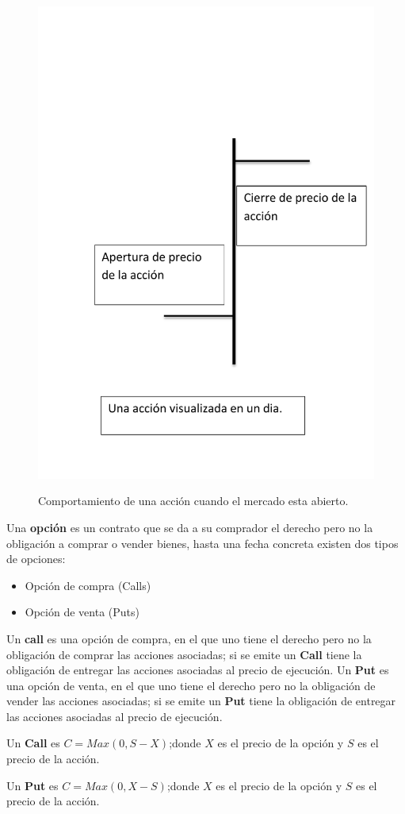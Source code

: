 		  \newline
		 \begin{figure}[h!]
		 	\centering
		 	\label{Apertura y cierre}
		 	\includegraphics[width=0.35\linewidth]{a}\\
		 	\caption[Titulo en el índice de figuras (opcional)]{Comportamiento de una acción cuando el mercado esta abierto.}
		 \end{figure}
		  \newpage
Una \textbf{opción} es un contrato que se da a su comprador el derecho pero no la obligación a comprar o vender bienes, hasta una fecha concreta existen dos tipos de opciones:
	\begin{itemize}
		\item Opción de compra (Calls) 
		\item Opción de venta (Puts) 
	
	\end{itemize}

Un \textbf{call} es una opción de compra, en el que uno tiene el derecho pero no la obligación de comprar las acciones asociadas; si se emite un \textbf{Call} tiene la obligación de entregar las acciones asociadas al precio de ejecución.    	
		\newline
Un \textbf{Put} es una opción de venta, en el que uno tiene el derecho pero no la obligación de vender las acciones asociadas; si se emite un \textbf{Put} tiene la obligación de entregar las acciones asociadas al precio de ejecución.    	
\newline		
\begin{defn}Un \textbf{ Call} es $ C=Max(0,S-X) $;donde $ X $ es el precio de la opción y $ S $ es el precio de la acción.	
	\end{defn}
\begin{defn}Un \textbf{ Put} es $ C=Max(0,X-S) $;donde $ X $ es el precio de la opción y $ S $ es el precio de la acción.	
\end{defn}	
